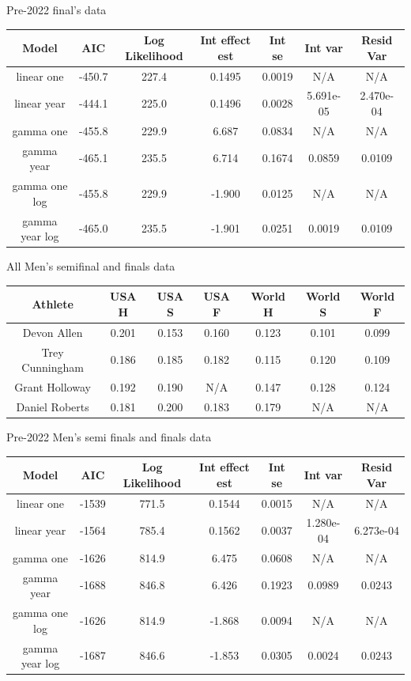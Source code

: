 \documentclass[12pt, letterpaper, titlepage]{article}
\begin{document}
Pre-2022 final's data
\begin{center}
  \begin{tabular}{|c | c | c | c | c | c | c |} 
   \hline\hline
   Model & AIC & Log Likelihood & Int effect est & Int se & Int var & Resid Var \\ [0.5ex] 
   \hline
   linear one & -450.7 & 227.4 & 0.1495 & 0.0019 & N/A & N/A \\
   \hline
   linear year & -444.1 & 225.0 & 0.1496 & 0.0028 & 5.691e-05 & 2.470e-04 \\ 
   \hline
   gamma one & -455.8 & 229.9 & 6.687 & 0.0834 & N/A & N/A \\
   \hline
   gamma year & -465.1 & 235.5 & 6.714 & 0.1674 & 0.0859 & 0.0109 \\
   \hline
   gamma one log & -455.8 & 229.9 & -1.900 & 0.0125 & N/A & N/A \\
   \hline
   gamma year log & -465.0 & 235.5 & -1.901 & 0.0251 & 0.0019 & 0.0109 \\ [0.5ex]
   \hline
  \end{tabular}
  \end{center}

All Men's semifinal and finals data
\begin{center}
  \begin{tabular}{||c | c c c | c c c||} 
   \hline
   Athlete & USA H & USA S & USA F & World H & World S & World F \\ [0.5ex] 
   \hline\hline
   Devon Allen & 0.201 & 0.153 & 0.160 & 0.123 & 0.101 & 0.099 \\ 
   \hline
   Trey Cunningham & 0.186 & 0.185 & 0.182 & 0.115 & 0.120 & 0.109 \\
   \hline
   Grant Holloway & 0.192 & 0.190 & N/A & 0.147 & 0.128 & 0.124 \\
   \hline
   Daniel Roberts & 0.181 & 0.200 & 0.183 & 0.179 & N/A & N/A \\ [0.5ex]
   \hline
  \end{tabular}
  \end{center}

Pre-2022 Men's semi finals and finals data
\begin{center}
  \begin{tabular}{|c | c | c | c | c | c | c |} 
   \hline
   Model & AIC & Log Likelihood & Int effect est & Int se & Int var & Resid Var \\ [0.5ex] 
   \hline\hline
   linear one & -1539 & 771.5 & 0.1544 & 0.0015 & N/A & N/A \\
   \hline
   linear year & -1564 & 785.4 & 0.1562 & 0.0037 & 1.280e-04 & 6.273e-04 \\ 
   \hline
   gamma one & -1626 & 814.9 & 6.475 & 0.0608 & N/A & N/A \\
   \hline
   gamma year & -1688 & 846.8 & 6.426 & 0.1923 & 0.0989 & 0.0243 \\
   \hline
   gamma one log & -1626 & 814.9 & -1.868 & 0.0094 & N/A & N/A \\
   \hline
   gamma year log & -1687 & 846.6 & -1.853 & 0.0305 & 0.0024 & 0.0243 \\ [0.5ex]
   \hline
  \end{tabular}
  \end{center}
\end{document}
